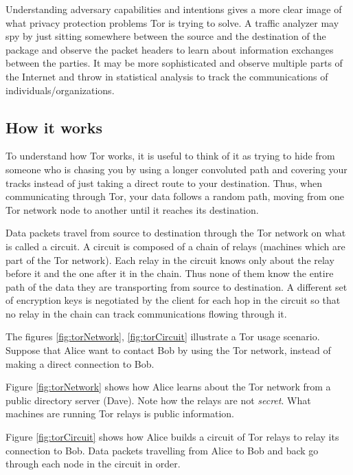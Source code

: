 \documentclass[11pt]{book} %
\begin{document}
Understanding adversary capabilities and intentions gives a more clear image of what privacy protection problems Tor is trying to solve. A traffic analyzer may spy by just sitting somewhere between the source and the destination of the package and observe the packet headers to learn about information exchanges between the parties. It may be more sophisticated and observe multiple parts of the Internet and throw in statistical analysis to track the communications of individuals/organizations.

\subsection{How it works}

To understand how Tor works, it is useful to think of it as trying to hide from someone who is chasing you by using a longer convoluted path and covering your tracks instead of just taking a direct route to your destination. Thus, when communicating through Tor, your data follows a random path, moving from one Tor network node to another until it reaches its destination.

Data packets travel from source to destination through the Tor network on what is called a circuit. A circuit is composed of a chain of relays (machines which are part of the Tor network). Each relay in the circuit knows only about the relay before it and the one after it in the chain. Thus none of them know the entire path of the data they are transporting from source to destination. A different set of encryption keys is negotiated by the client for each hop in the circuit so that no relay in the chain can track communications flowing through it. \citep*{web:torOverview}

The figures \ref{fig:torNetwork}, \ref{fig:torCircuit} illustrate a Tor usage scenario. Suppose that Alice want to contact Bob by using the Tor network, instead of making a direct connection to Bob.

Figure \ref{fig:torNetwork} shows how Alice learns about the Tor network from a public directory server (Dave). Note how the relays are not \textit{secret}. What machines are running Tor relays is public information.

Figure \ref{fig:torCircuit} shows how Alice builds a circuit of Tor relays to relay its connection to Bob. Data packets travelling from Alice to Bob and back go through each node in the circuit in order. 
\end{document}
